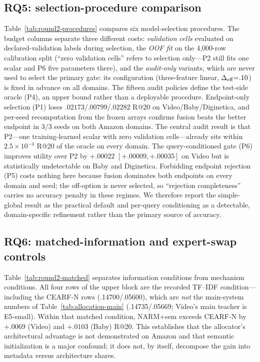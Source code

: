 \documentclass[runningheads]{llncs}
\begin{document}
\subsection{RQ5: selection-procedure comparison}
Table~\ref{tab:round2-procedures} compares six model-selection procedures.
The budget columns separate three different costs: \emph{validation cells}
evaluated on declared-validation labels during selection, the \emph{OOF fit}
on the 4,000-row calibration split (``zero validation cells'' refers to
selection only---P2 still fits one scalar and P6 five parameters there), and
the \emph{audit-only} variants, which are never used to select the primary
gate: its configuration (three-feature linear, $\Delta_{\rm eff}{=}.10$) is
fixed in advance on all domains. The fifteen audit policies define the
test-side oracle (P4), an upper bound rather than a deployable procedure.
Endpoint-only selection (P1) loses $.02173$/$.00799$/$.02282$ R@20 on
Video/Baby/Diginetica, and per-seed recomputation from the frozen arrays
confirms fusion beats the better endpoint in $3/3$ seeds on both Amazon
domains. The central audit result is that P2---one training-learned scalar
with zero validation cells---already sits within $2.5\times10^{-4}$ R@20 of
the oracle on every domain. The query-conditioned gate (P6) improves utility
over P2 by $+.00022$ $[+.00009,+.00035]$ on Video but is statistically
undetectable on Baby and Diginetica. Forbidding endpoint rejection (P5)
costs nothing here because fusion dominates both endpoints on every domain
and seed; the off-option is never selected, so ``rejection completeness''
carries no accuracy penalty in these regimes. We therefore report the
simple-global result as the practical default and per-query conditioning as
a detectable, domain-specific refinement rather than the primary source of
accuracy.


\subsection{RQ6: matched-information and expert-swap controls}
Table~\ref{tab:round2-matched} separates information conditions from
mechanism conditions. All four rows of the upper block are the recorded
TF--IDF condition---including the CEARF-N rows (.14700/.05600), which are
\emph{not} the main-system numbers of
Table~\ref{tab:allocation-main} (.14735/.05669; Video's main teacher is
E5-small). Within that matched condition, NARM+sem exceeds CEARF-N by
$+.0069$ (Video) and $+.0103$ (Baby) R@20. This establishes that the
allocator's architectural advantage is not demonstrated on Amazon and that
semantic initialization is a major confound; it does not, by itself,
decompose the gain into metadata versus architecture shares.
\end{document}
